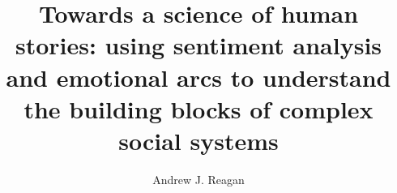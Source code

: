 \title{Towards a science of human stories:
using sentiment analysis and emotional arcs to understand
the building blocks of complex social systems}
\author{Andrew J. Reagan}
\dissertation                             %
\doctorphilosophy                      %
\masci                                 %
\maygrad                            %
\def\gradyear{2017}
